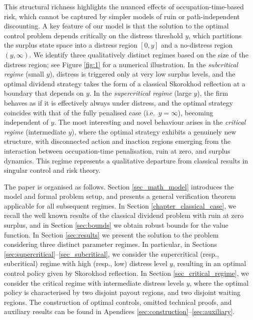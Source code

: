 \documentclass[11pt]{article} %
\numberwithin{komcounter}{section}
\numberwithin{equation}{section}
\numberwithin{theorem}{section}
\begin{document}
This structural richness highlights the nuanced effects of occupation-time-based risk, which cannot be captured by simpler models of ruin or path-independent discounting. 
A key feature of our model is that the solution to the optimal control problem depends critically on the distress threshold $y$, which partitions the surplus state space into a distress region $[0,y]$ and a no-distress region $(y,\infty)$. 
We identify three qualitatively distinct regimes based on the size of the distress region; see Figure \ref{fig:1} for a numerical illustration.
In the {\it subcritical regime} (small $y$), distress is triggered only at very low surplus levels, and the optimal dividend strategy takes the form of a classical Skorokhod reflection at a boundary that depends on $y$. 
In the {\it supercritical regime} (large $y$), the firm behaves as if it is effectively always under distress, and the optimal strategy coincides with that of the fully penalised case (i.e.~$y=\infty$), becoming independent of $y$. 
The most interesting and novel behaviour arises in the {\it critical regime} (intermediate $y$), where the optimal strategy exhibits a genuinely new structure, with disconnected action and inaction regions emerging from the interaction between occupation-time penalisation, ruin at zero, and surplus dynamics. 
This regime represents a qualitative departure from classical results in singular control and risk theory.


The paper is organised as follows. 
Section \ref{sec_math_model} introduces the model and formal problem setup, and presents a general verification theorem applicable for all subsequent regimes. 
In Section \ref{chapter_classical_case}, we recall the well known results of the classical dividend problem with ruin at zero surplus, and in Section \ref{sec:bounds} we obtain robust bounds for the value function. 
In Section \ref{sec:results} we present the solution to the problem considering three distinct parameter regimes. 
In particular, in Sections \ref{sec:supercritical}--\ref{sec_subcritical}, we consider the supercritical (resp., subcritical) regime with high (resp., low) distress level $y$, resulting in an optimal control policy given by Skorokhod reflection. 
In Section \ref{sec_critical_regime}, we consider the critical regime  with intermediate distress levels $y$, where the optimal policy is characterised by two disjoint payout regions, and two disjoint waiting regions.
The construction of optimal controls, omitted technical proofs, and auxiliary results can be found in Apendices \ref{sec:construction}--\ref{sec:auxiliary}.
\end{document}
